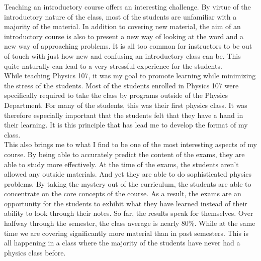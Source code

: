 Teaching an introductory course offers an interesting challenge.  By virtue of the introductory nature of the class, most of the students are unfamiliar with a majority of the material.  In addition to covering new material, the aim of an introductory course is also to present a new way of looking at the word and a new way of approaching problems.  It is all too common for instructors to be out of touch with just how new and confusing an introductory class can be.  This quite naturally can lead to a very stressful experience for the students.\\

While teaching Physics 107, it was my goal to promote learning while minimizing the stress of the students.  Most of the students enrolled in Physics 107 were specifically required to take the class by programs outside of the Physics Department.  For many of the students, this was their first physics class.  It was therefore especially important that the students felt that they have a hand in their learning.  It is this principle that has lead me to develop the format of my class.\\

This also brings me to what I find to be one of the most interesting aspects of my course.  By being able to accurately predict the content of the exams, they are able to study more effectively.
At the time of the exams, the students aren't allowed any outside materials.  And yet they are able to do sophisticated physics problems.  By taking the mystery out of the curriculum, the students are able to concentrate on the core concepts of the course.  As a result, the exams are an opportunity for the students to exhibit what they have learned instead of their ability to look through their notes.
So far, the results speak for themselves.  Over halfway through the semester, the class average is nearly 80\%.  While at the same time we are covering significantly more material than in past semesters.  This is all happening in a class where the majority of the students have never had a physics class before.